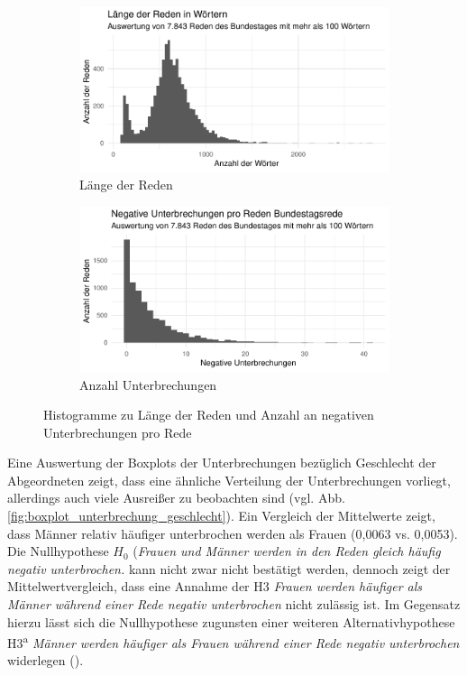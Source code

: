 \documentclass[12pt, 
    twoside=false, 
    bibliography=totoc, 
    numbers=endperiod, 
    headings=normal, 
    toc=chapterentrydotfill
    ]{scrbook}
\begin{document}
\begin{figure}[H]
    \centering
    \begin{subfigure}{.5\textwidth}
      \centering
      \includegraphics[width=.9\linewidth]{document/images/histo_laenge_rede.pdf}
      \caption{Länge der Reden}
      \label{fig:histo_laenge}
    \end{subfigure}%
    \begin{subfigure}{.5\textwidth}
      \centering
      \includegraphics[width=.9\linewidth]{document/images/histo_anzahl_unterbrechung.pdf}
      \caption{Anzahl Unterbrechungen}
      \label{fig:histo_unterbrechung}
    \end{subfigure}
    \caption[Histogramme zu Länge der Reden und Anzahl an negativen Unterbrechungen pro Rede]{Histogramme zu Länge der Reden und Anzahl an negativen Unterbrechungen pro Rede}
    \label{fig:histogramme}
\end{figure}

Eine Auswertung der Boxplots der Unterbrechungen bezüglich Geschlecht der Abgeordneten zeigt, dass eine ähnliche Verteilung der Unterbrechungen vorliegt, allerdings auch viele Ausreißer zu beobachten sind (vgl. Abb. \ref{fig:boxplot_unterbrechung_geschlecht}). Ein Vergleich der Mittelwerte zeigt, dass Männer relativ häufiger unterbrochen werden als Frauen (0,0063 vs. 0,0053). Die Nullhypothese $H_0$ (\emph{Frauen und Männer werden in den Reden gleich häufig negativ unterbrochen.} kann nicht zwar nicht bestätigt werden, dennoch zeigt der Mittelwertvergleich, dass eine Annahme der H3 \emph{Frauen werden häufiger als Männer während einer Rede negativ unterbrochen} nicht zulässig ist. Im Gegensatz hierzu lässt sich die Nullhypothese zugunsten einer weiteren Alternativhypothese H3\textsuperscript{a} \emph{Männer werden häufiger als Frauen während einer Rede negativ unterbrochen} widerlegen (). 
\end{document}
